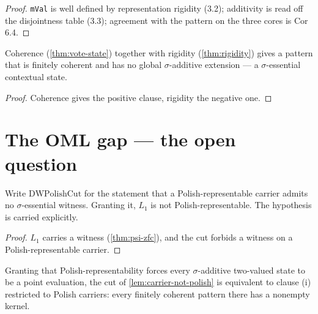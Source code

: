 \begin{proof}
\leanok
\texttt{mVal} is well defined by representation rigidity (3.2); additivity is read off the disjointness table (3.3); agreement with the pattern on the three cores is Cor 6.4.
\end{proof}

\begin{theorem}
\label{thm:core-pattern-witness}
\leanok
{}
Coherence (\ref{thm:vote-state}) together with rigidity (\ref{thm:rigidity})
gives a pattern that is finitely coherent and has no global $\sigma$-additive
extension --- a $\sigma$-essential contextual state.
\end{theorem}

\begin{proof}
\leanok
Coherence gives the positive clause, rigidity the negative one.
\end{proof}
\section{The OML gap --- the open question}

\begin{lemma}
\label{lem:carrier-not-polish}
\leanok
  Write $\mathrm{DWPolishCut}$ for the statement that a Polish-representable
carrier admits no $\sigma$-essential witness. Granting it, $L_1$ is not
Polish-representable. The hypothesis is carried explicitly.
\end{lemma}

\begin{proof}
\leanok
{}
$L_1$ carries a witness (\ref{thm:psi-zfc}), and the cut forbids a witness on a
Polish-representable carrier.
\end{proof}
\begin{theorem}
  \label{thm:polish-cut-reduced}
  \leanok
  Granting that Polish-representability forces every $\sigma$-additive two-valued
  state to be a point evaluation, the cut of \ref{lem:carrier-not-polish} is
  equivalent to clause (i) restricted to Polish carriers: every finitely coherent
  pattern there has a nonempty kernel.
\end{theorem}

